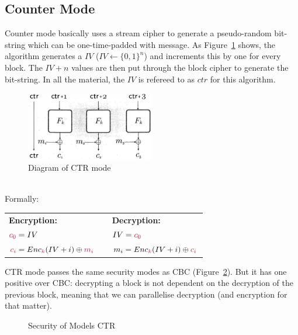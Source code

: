     \subsection{Counter Mode}
    Counter mode basically uses a stream cipher to generate a pseudo-random bit-string which can be one-time-padded with message. As Figure~\ref{fig:ctr} shows, the algorithm generates a $IV$ ($IV \leftarrow \{0,1\}^n$) and increments this by one for every block. The $IV+n$ values are then put through the block cipher to generate the bit-string. In all the material, the $IV$ is refereed to as $ctr$ for this algorithm.\\
    \begin{figure}[htp!]
        \centering
        \includegraphics[width=0.5\textwidth]{img/ctr.png}
        \caption{Diagram of CTR mode}
        \label{fig:ctr}
    \end{figure}
    \\
    Formally:
    \begin{center}
        \begin{tabular}{lll}
            \textbf{Encryption:} && \textbf{Decryption:}\\
            $\csubc{0} = IV$ && $IV = \csubc{0}$\\
            $\csubc{i} = Enc_\ck(IV + i) \oplus \csubm{i}$ && $m_i = Enc_\ck(IV + i) \oplus \csubc{i}$
        \end{tabular}
    \end{center}
    CTR mode passes the same security modes as CBC (Figure~\ref{fig:ctr-attacktable}). But it has one positive over CBC: decrypting a block is not dependent on the decryption of the previous block, meaning that we can parallelise decryption (and encryption for that matter).
    \begin{figure}[htp!]
        \centering
        \caption{Security of Models CTR}
        \label{fig:ctr-attacktable}
    \end{figure}





